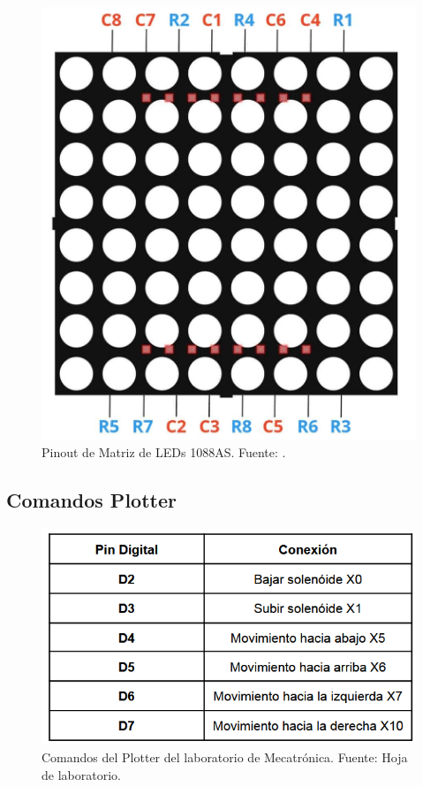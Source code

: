 \begin{figure}[H]
  \centering
  \includegraphics[width=0.7\linewidth]{./Anexos/1088ASPinout.jpg}
  \caption{Pinout de Matriz de LEDs 1088AS. Fuente: \cite{softwareparticles_8x8_arduino}.}
  \label{fig:1088as-pinout}
\end{figure}


\subsection{Comandos Plotter}

\begin{figure}[H]
  \centering
  \includegraphics[width=0.9\linewidth]{./Anexos/Comandos Plotter.png}
  \caption{Comandos del Plotter del laboratorio de Mecatrónica. Fuente: Hoja de laboratorio.}
  \label{fig:comandos-plotter}
\end{figure}

